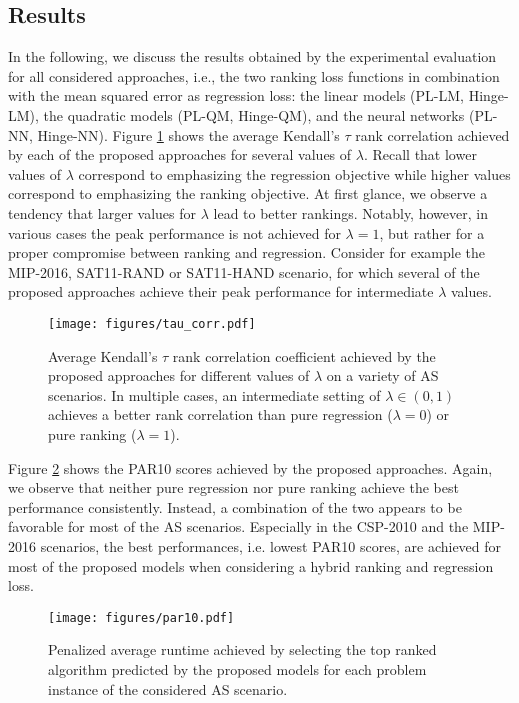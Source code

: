 \documentclass[runningheads]{llncs}
\begin{document}
\subsection{Results}
In the following, we discuss the results obtained by the experimental evaluation for all considered approaches, i.e., the two ranking loss functions in combination with the mean squared error as regression loss: the linear models (PL-LM, Hinge-LM), the quadratic models (PL-QM, Hinge-QM), and the neural networks (PL-NN, Hinge-NN). Figure \ref{fig:plots_tau} shows the average Kendall's $\tau$ rank correlation achieved by each of the proposed approaches for several values of $\lambda$. Recall that lower values of $\lambda$ correspond to emphasizing the regression objective while higher values correspond to emphasizing the ranking objective. At first glance, we observe a tendency that larger values for $\lambda$ lead to better rankings. Notably, however, in various cases the peak performance is not achieved for $\lambda=1$, but rather for a proper compromise between ranking and regression. Consider for example the MIP-2016, SAT11-RAND or SAT11-HAND scenario, for which several of the proposed approaches achieve their peak performance for intermediate $\lambda$ values. 

\begin{figure}[ht]
    \centering
    \texttt{[image: figures/tau\_corr.pdf]}
    \caption[Average Kendall's $\tau$ rank correlation coefficient]{Average Kendall's $\tau$ rank correlation coefficient achieved by the proposed approaches for different values of $\lambda$ on a variety of AS scenarios. In multiple cases, an intermediate setting of $\lambda \in (0,1)$ achieves a better rank correlation than pure regression ($\lambda=0$) or pure ranking ($\lambda=1$).}
    \label{fig:plots_tau}
\end{figure}

Figure \ref{fig:plots_par10} shows the PAR10 scores achieved by the proposed approaches. Again, we observe that neither pure regression nor pure ranking achieve the best performance consistently. Instead, a combination of the two appears to be favorable for most of the AS scenarios. Especially in the CSP-2010 and the MIP-2016 scenarios, the best performances, i.e. lowest PAR10 scores, are achieved for most of the proposed models when considering a hybrid ranking and regression loss.

\begin{figure}[ht]
    \centering
    \texttt{[image: figures/par10.pdf]}
    \caption{Penalized average runtime achieved by selecting the top ranked algorithm predicted by the proposed models for each problem instance of the considered AS scenario.} 
    \label{fig:plots_par10}
\end{figure}
\end{document}
